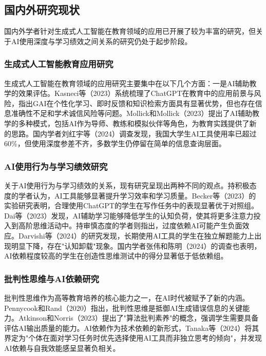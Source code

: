 \documentclass{njtech-thesis}
\begin{document}
\subsection{国内外研究现状}

国内外学者针对生成式人工智能在教育领域的应用已开展了较为丰富的研究，但关于AI使用深度与学习绩效之间关系的研究仍处于起步阶段。

\subsubsection{生成式人工智能教育应用研究}

生成式人工智能在教育领域的应用研究主要集中在以下几个方面：一是AI辅助教学的效果评估。Kasneci等（2023）系统梳理了ChatGPT在教育中的应用前景与风险，指出GAI在个性化学习、即时反馈和知识检索方面具有显著优势，但也存在信息准确性不足和学术诚信风险等问题。Mollick和Mollick（2023）提出了AI辅助教学的多种模式，包括AI作为导师、教练和模拟伙伴等角色，为教育实践提供了新的思路。国内学者刘红宇等（2024）调查发现，我国大学生AI工具使用率已超过60\%，但使用深度参差不齐，多数学生仍停留在简单的信息查询层面。

\subsubsection{AI使用行为与学习绩效研究}

关于AI使用行为与学习绩效的关系，现有研究呈现出两种不同的观点。持积极态度的学者认为，AI工具能够显著提升学习效率和学习质量。Becker等（2023）的实验研究表明，合理使用ChatGPT的学生在写作任务中的表现显著优于对照组。Dai等（2023）发现，AI辅助学习能够降低学生的认知负荷，使其将更多注意力投入到高阶思维活动中。持审慎态度的学者则指出，过度依赖AI可能产生负面效应。Darvishi等（2024）的研究发现，长期使用AI工具的学生在独立解题能力上出现明显下降，存在"认知卸载"现象。国内学者张伟和陈明（2024）的调查也表明，AI依赖程度较高的学生在创造性思维测试中的得分显著低于低依赖组。

\subsubsection{批判性思维与AI依赖研究}

批判性思维作为高等教育培养的核心能力之一，在AI时代被赋予了新的内涵。Pennycook和Rand（2020）指出，批判性思维是抵御AI生成错误信息的关键能力。Atkinson和Norris（2023）提出了"算法批判素养"的概念，强调学生需要具备评估AI输出质量的能力。AI依赖作为技术依赖的新形式，Tanaka等（2024）将其界定为"个体在面对学习任务时优先选择使用AI工具而非独立思考的倾向"，并发现AI依赖与自我效能感呈显著负相关。
\end{document}
